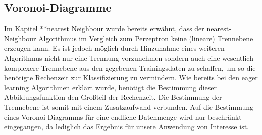 \documentclass[a4paper]{scrartcl}
\begin{document}
\begin{multicols}{2}
                        \section{Voronoi-Diagramme}
                        Im Kapitel **nearest Neighbour wurde bereits erwähnt, dass der nearest-Neighbour Algorithmus im Vergleich zum Perzeptron keine (lineare) Trennebene erzeugen kann. Es ist jedoch möglich durch Hinzunahme eines weiteren Algorithmus nicht nur eine Trennung vorzunehmen sondern auch eine wesentlich komplexere Trennebene aus den gegebenen Trainingsdaten zu schaffen, um so die benötigte Rechenzeit zur Klassifizierung zu vermindern.
                        Wie bereits bei den eager learning Algorithmen erklärt wurde, benötigt die Bestimmung dieser Abbildungsfunktion den Großteil der Rechenzeit. Die Bestimmung der Trennebene ist somit mit einem Zusatzaufwand verbunden. 
                        Auf die Bestimmung eines Voronoi-Diagramms für eine endliche Datenmenge wird nur beschränkt eingegangen, da lediglich das Ergebnis für unsere Anwendung von Interesse ist.
                        

\end{multicols}
\end{document}
